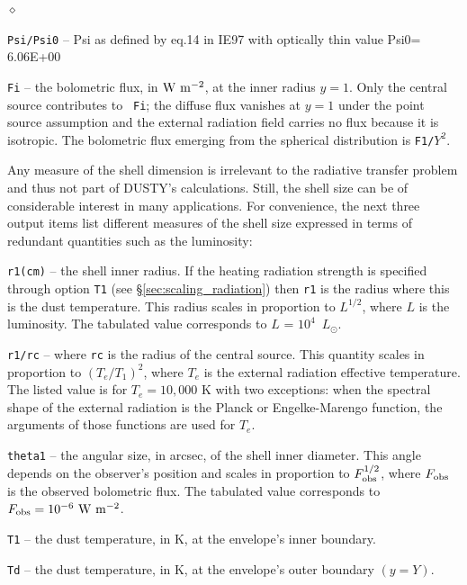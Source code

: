 \documentclass[11pt]{article}
\def\D    {{\sf DUSTY}}
\def\E#1{\hbox{$10^{#1}$}}
\def\Lo     {\hbox{$L_{\odot}$}}
\begin{document}
\begin{list}{$\diamond$}{}
\item {\tt Psi/Psi0} -- Psi as defined by eq.14 in IE97 with optically
  thin value Psi0= 6.06E+00
\item {\tt Fi} -- the bolometric flux, in $\rm W\ m^{-2}$, at the
  inner radius $y = 1$. Only the central source contributes to {\tt
    Fi}; the diffuse flux vanishes at $y = 1$ under the point source
  assumption and the external radiation field carries no flux because
  it is isotropic. The bolometric flux emerging from the spherical
  distribution is {\tt F1/$Y^2$}.

  Any measure of the shell dimension is irrelevant to the radiative
  transfer problem and thus not part of \D's calculations.  Still, the
  shell size can be of considerable interest in many applications. For
  convenience, the next three output items list different measures of
  the shell size expressed in terms of redundant quantities such as
  the luminosity:

\item {\tt r1(cm)} -- the shell inner radius. If the heating radiation
  strength is specified through option {\tt T1} (see
  \S\ref{sec:scaling_radiation}) then {\tt r1} is the radius where
  this is the dust temperature. This radius scales in proportion to
  $L^{1/2}$, where $L$ is the luminosity. The tabulated value
  corresponds to $L$ = \E4~\Lo.

\item {\tt r1/rc} -- where {\tt rc} is the radius of the central
  source.  This quantity scales in proportion to $(T_e/T_1)^2$, where
  $T_e$ is the external radiation effective temperature.  The listed
  value is for $T_e = 10,000$ K with two exceptions: when the spectral
  shape of the external radiation is the Planck or Engelke-Marengo
  function, the arguments of those functions are used for $T_e$.

\item {\tt theta1} -- the angular size, in arcsec, of the shell inner
  diameter.  This angle depends on the observer's position and scales
  in proportion to $F_{\rm obs}^{1/2}$, where $F_{\rm obs}$ is the
  observed bolometric flux.  The tabulated value corresponds to
  $F_{\rm obs} = \E{-6}\ \rm W\ m^{-2}$.

\item {\tt T1} -- the dust temperature, in K, at the envelope's inner
  boundary.

\item {\tt Td} -- the dust temperature, in K, at the envelope's outer
  boundary $(y = Y)$.


\end{list}
\end{document}
